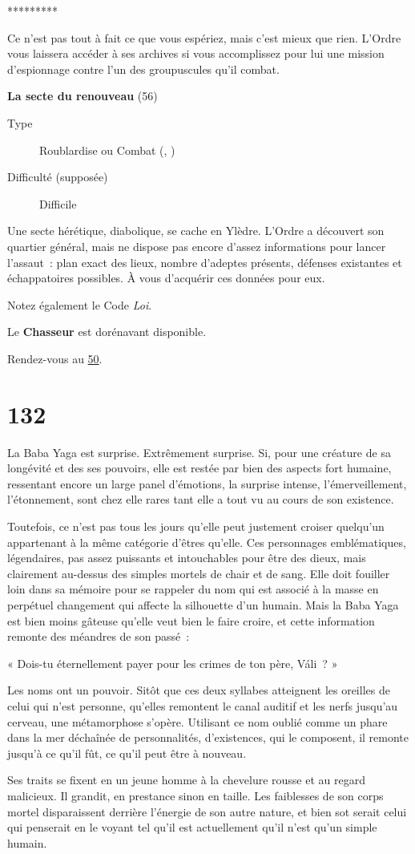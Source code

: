\documentclass{report}
\newcommand{\gsection}[1]{
    \section{#1}
    \label{section-#1}
}
\newcommand{\glink}[1]{\hyperref[section-#1]{#1}}
\newcommand{\quest}[5]{
    \begin{mdframed}[innertopmargin=0.5cm,innerbottommargin=0.5cm,leftmargin=0.5cm,rightmargin=0.5cm]
        \begin{center}
            \textbf{#1} (#2)
        \end{center}
        \begin{description}
            \item[Type] #3
            \item[Difficulté (supposée)] #4
        \end{description}
        #5
    \end{mdframed}
}
\newcommand{\ellipse}{
    \begin{center}
        *********
    \end{center}
}
\newcommand{\hero}[1]{\textbf{#1}}
\begin{document}
\ellipse

Ce n'est pas tout à fait ce que vous espériez, mais c'est mieux que rien. L'Ordre vous laissera accéder  à ses archives si vous accomplissez pour lui une mission d'espionnage contre l'un des groupuscules qu'il combat.

\quest{La secte du renouveau}{56}{Roublardise ou Combat (\ankh, \cross)}{Difficile}{
Une secte hérétique, diabolique, se cache en Ylèdre. L'Ordre a découvert son quartier général, mais ne dispose pas encore d'assez informations pour lancer l'assaut : plan exact des lieux, nombre d'adeptes présents, défenses existantes et échappatoires possibles. À vous d'acquérir ces données pour eux.
}

Notez également le Code \emph{Loi}.

Le \hero{Chasseur} est dorénavant disponible.

Rendez-vous au \glink{50}.

\gsection{132}

La Baba Yaga est surprise. Extrêmement surprise. Si, pour une créature de sa longévité et des ses pouvoirs, elle est restée par bien des aspects fort humaine, ressentant encore un large panel d'émotions, la surprise intense, l'émerveillement, l'étonnement, sont chez elle rares tant elle a tout vu au cours de son existence.

Toutefois, ce n'est pas tous les jours qu'elle peut justement croiser quelqu'un appartenant à la même catégorie d'êtres qu'elle. Ces personnages emblématiques, légendaires, pas assez puissants et intouchables pour être des dieux, mais clairement au-dessus des simples mortels de chair et de sang. Elle doit fouiller loin dans sa mémoire pour se rappeler du nom qui est associé à la masse en perpétuel changement qui affecte la silhouette d'un humain. Mais la Baba Yaga est bien moins gâteuse qu'elle veut bien le faire croire, et cette information remonte des méandres de son passé :

« Dois-tu éternellement payer pour les crimes de ton père, Váli ? »

Les noms ont un pouvoir. Sitôt que ces deux syllabes atteignent les oreilles de celui qui n'est personne, qu'elles remontent le canal auditif et les nerfs jusqu'au cerveau, une métamorphose s'opère. Utilisant ce nom oublié comme un phare dans la mer déchaînée de personnalités, d'existences, qui le composent, il remonte jusqu'à ce qu'il fût, ce qu'il peut être à nouveau.

Ses traits se fixent en un jeune homme à la chevelure rousse et au regard malicieux. Il grandit, en prestance sinon en taille. Les faiblesses de son corps mortel disparaissent derrière l'énergie de son autre nature, et bien sot serait celui qui penserait en le voyant tel qu'il est actuellement qu'il n'est qu'un simple humain.
\end{document}
